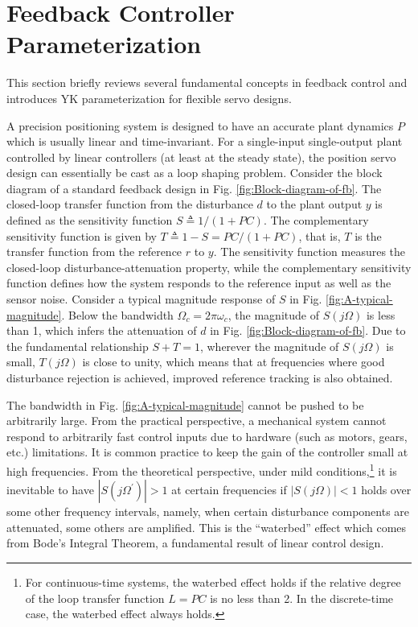 \documentclass [11pt, proquest] {uwthesis}[2020/02/24]
\begin{document}
\section{Feedback Controller Parameterization}

\label{sec:FB}This section briefly reviews several fundamental concepts
in feedback control and introduces YK parameterization for flexible
servo designs.

A precision positioning system is designed to have an accurate plant
dynamics $P$ which is usually linear and time-invariant. For a single-input
single-output plant controlled by linear controllers (at least at
the steady state), the position servo design can essentially be cast
as a loop shaping problem. Consider the block diagram of a standard
feedback design in Fig. \ref{fig:Block-diagram-of-fb}.
The closed-loop transfer function from the disturbance $d$ to
the plant output $y$ is defined as the sensitivity function $S\triangleq1/(1+PC)$.
The complementary sensitivity function is given by $T\triangleq1-S=PC/(1+PC)$,
that is, $T$ is the transfer function from the reference $r$ to
$y$. The sensitivity function measures the closed-loop disturbance-attenuation
property, while the complementary sensitivity function defines how
the system responds to the reference input as well as the sensor noise.
Consider a typical magnitude response of $S$ in Fig. \ref{fig:A-typical-magnitude}.
Below the bandwidth $\Omega_{c}=2\pi\omega_{c}$, the magnitude of
$S(j\Omega)$ is less than 1, which infers the attenuation of $d$
in Fig. \ref{fig:Block-diagram-of-fb}. Due to the fundamental
relationship $S+T=1$, wherever the magnitude of $S(j\Omega)$ is
small, $T(j\Omega)$ is close to unity, which means that at frequencies
where good disturbance rejection is achieved, improved reference tracking
is also obtained.

The bandwidth in Fig. \ref{fig:A-typical-magnitude} cannot be pushed
to be arbitrarily large. From the practical perspective, a mechanical
system cannot respond to arbitrarily fast control inputs due to hardware
(such as motors, gears, etc.) limitations. It is common practice to
keep the gain of the controller small at high frequencies. From the
theoretical perspective, under mild conditions,\footnote{For continuous-time systems, the waterbed effect holds if the relative
degree of the loop transfer function $L=PC$ is no less than 2. In
the discrete-time case, the waterbed effect always holds.} it is inevitable to have $|S(j\Omega^{'})|>1$ at certain frequencies
if $|S(j\Omega)|<1$ holds over some other frequency intervals, namely,
when certain disturbance components are attenuated, some others are
amplified. This is the ``waterbed'' effect which comes from Bode's
Integral Theorem, a fundamental result of linear control design. 
\end{document}
